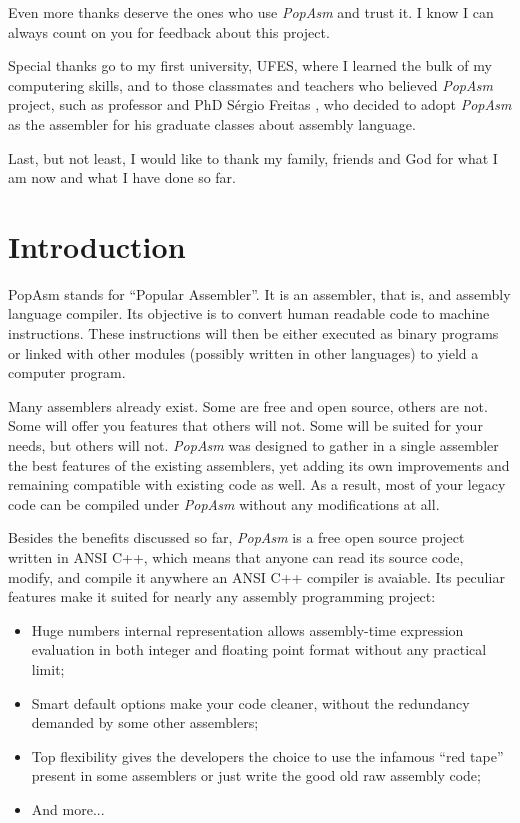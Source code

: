\documentclass[a4paper,12pt]{book}
\begin{document}
Even more thanks deserve the ones who use \emph{PopAsm} and trust it. I know I can always count on you for
feedback about this project.

Special thanks go to my first university, UFES\cite{UFES}, where I learned the bulk of my computering skills, and
to those classmates and teachers who believed \emph{PopAsm} project, such as professor and PhD S\'ergio Freitas
\cite{FREITAS}, who decided to adopt \emph{PopAsm} as the assembler for his graduate classes about assembly
language.

Last, but not least, I would like to thank my family, friends and God for what I am now and what I have done so far.

\chapter{Introduction}
PopAsm stands for ``Popular Assembler''. It is an assembler, that is, and assembly language compiler. Its objective
is to convert human readable code to machine instructions. These instructions will then be either executed as binary
programs or linked with other modules (possibly written in other languages) to yield a computer program.

Many assemblers already exist. Some are free and open source, others are not. Some will offer you features that others
will not. Some will be suited for your needs, but others will not. \emph{PopAsm} was designed to gather in a single
assembler the best features of the existing assemblers, yet adding its own improvements and remaining compatible with
existing code as well. As a result, most of your legacy code can be compiled under \emph{PopAsm} without any modifications
at all.

Besides the benefits discussed so far, \emph{PopAsm} is a free open source project written in ANSI C++, which means
that anyone can read its source code, modify, and compile it anywhere an ANSI C++ compiler is avaiable. Its peculiar
features make it suited for nearly any assembly programming project:

\begin{itemize}
	\item{Huge numbers internal representation} allows assembly-time expression evaluation in both integer and floating
		point format without any practical limit;
   \item{Smart default options} make your code cleaner, without the redundancy demanded by some other assemblers;
	\item{Top flexibility} gives the developers the choice to use the infamous ``red tape'' present in some assemblers
		or just write the good old raw assembly code;
	\item{And more...}
\end{itemize}
\end{document}
